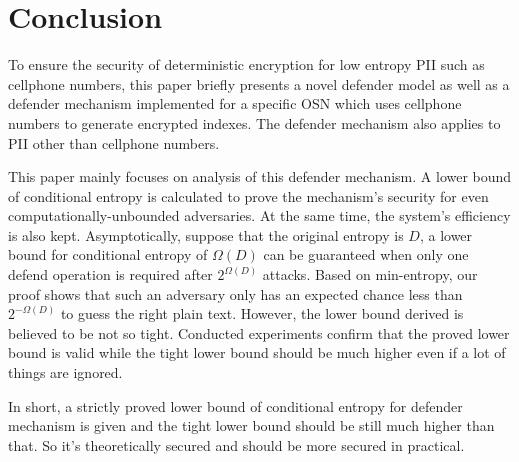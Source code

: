 \documentclass[10pt, conference, compsocconf]{IEEEtran}
\begin{document}
\section{Conclusion}
	To ensure the security of deterministic encryption
	for low entropy PII such as cellphone numbers,
	this paper briefly presents a novel defender model as well
	as a defender mechanism implemented for a specific
	OSN which uses cellphone numbers to generate encrypted indexes. 
	The defender mechanism also applies to PII other than
	cellphone numbers.
	
	This paper mainly focuses on analysis of this defender mechanism.
	A lower bound of conditional entropy is calculated to
	prove the mechanism's security for even
	computationally-unbounded adversaries.
	At the same time, the system's efficiency is also kept.
	Asymptotically, suppose that the original entropy is $D$,
	a lower bound for conditional entropy of $\Omega(D)$ can be
	guaranteed when only one defend operation is required after
	$2^{\Omega(D)}$ attacks.
	Based on min-entropy, our proof shows that
	such an adversary only has an expected chance 
	less than $2^{-\Omega(D)}$ to guess the right plain text.
	However, the lower bound derived
	is believed to be not so tight. 
	Conducted experiments confirm that the proved lower bound is valid while
	the tight lower bound
	should be much higher even if a lot of things are ignored.
	
	In short, a strictly proved lower bound of conditional entropy
	for defender mechanism is given
	and the tight lower bound should be still much higher than that.
	So it's theoretically secured and should be more secured in practical.	
	


%
%




%
%
%
\end{document}
